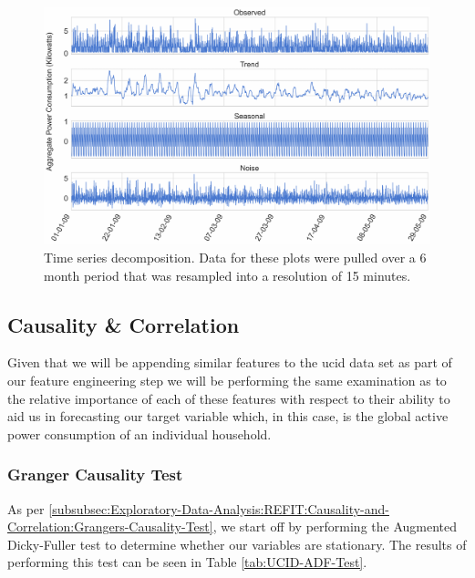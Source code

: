 \begin{figure}[H]
    \centering
    \includegraphics[width=\textwidth]{Images/Chapter 5/UCID/UCID-Time-Series-Decomposition-NoSmoothing.pdf}
    \caption{Time series decomposition. Data for these plots were pulled over a 6 month period that was resampled into a resolution of 15 minutes.}
    \label{fig:UCID-Time-Series-Decomposition}
\end{figure}

\subsection{Causality \& Correlation}
\label{subsec:Exploratory-Data-Analysis:UCID:Causality-and-Correlation}
Given that we will be appending similar features to the \gls{ucid} data set as part of our feature engineering step we will be performing the same examination as to the relative importance of each of these features with respect to their ability to aid us in forecasting our target variable which, in this case, is the global active power consumption of an individual household.

\subsubsection{Granger Causality Test}
\label{subsubsec:Exploratory-Data-Analysis:UCID:Causality-and-Correlation:Grangers-Causality-Test}
As per \ref{subsubsec:Exploratory-Data-Analysis:REFIT:Causality-and-Correlation:Grangers-Causality-Test}, we start off by performing the Augmented Dicky-Fuller test to determine whether our variables are stationary. The results of performing this test can be seen in Table \ref{tab:UCID-ADF-Test}.

